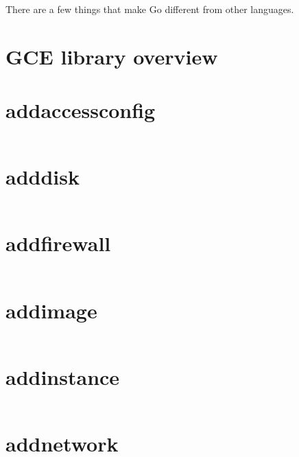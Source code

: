 \noindent{}There are a few things that make Go different from other
languages.


\section{GCE library overview}

\section{addaccessconfig}
\begin{lstlisting}[language=Bash]
\end{lstlisting}

\section{adddisk}
\begin{lstlisting}[language=Bash]
\end{lstlisting}

\section{addfirewall}
\begin{lstlisting}[language=Bash]
\end{lstlisting}

\section{addimage}
\begin{lstlisting}[language=Bash]
\end{lstlisting}

\section{addinstance}
\begin{lstlisting}[language=Bash]
\end{lstlisting}

\section{addnetwork}
\begin{lstlisting}[language=Bash]
\end{lstlisting}

